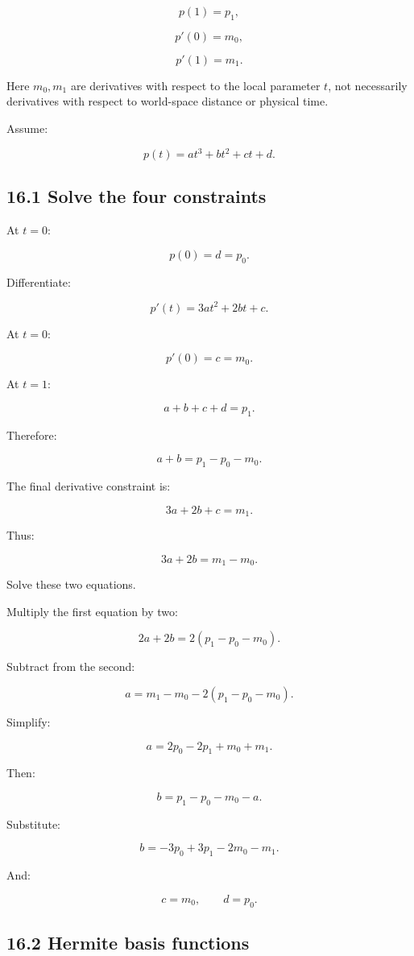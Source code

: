 \[ p(1)=p_1, \]

\[ p'(0)=m_0, \]

\[ p'(1)=m_1. \]

Here \(m_0,m_1\) are derivatives with respect to the local parameter \(t\), not necessarily derivatives with respect to world-space distance or physical time.

Assume:

\[ p(t)=at^3+bt^2+ct+d. \]

\subsection{16.1 Solve the four constraints}\label{02-foundations-ii-ch028-solve-the-four-constraints}

\hypertarget{02-foundations-ii-ch028-solve-the-four-constraints}{}

At \(t=0\):

\[ p(0)=d=p_0. \]

Differentiate:

\[ p'(t)=3at^2+2bt+c. \]

At \(t=0\):

\[ p'(0)=c=m_0. \]

At \(t=1\):

\[ a+b+c+d=p_1. \]

Therefore:

\[ a+b=p_1-p_0-m_0. \]

The final derivative constraint is:

\[ 3a+2b+c=m_1. \]

Thus:

\[ 3a+2b=m_1-m_0. \]

Solve these two equations.

Multiply the first equation by two:

\[ 2a+2b=2(p_1-p_0-m_0). \]

Subtract from the second:

\[ a=m_1-m_0-2(p_1-p_0-m_0). \]

Simplify:

\[ \boxed{ a=2p_0-2p_1+m_0+m_1 }. \]

Then:

\[ b=p_1-p_0-m_0-a. \]

Substitute:

\[ \boxed{ b=-3p_0+3p_1-2m_0-m_1 }. \]

And:

\[ c=m_0,\qquad d=p_0. \]

\subsection{16.2 Hermite basis functions}\label{02-foundations-ii-ch028-hermite-basis-functions}

